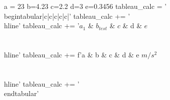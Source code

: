 \begin{pycode}
a = 23
b=4.23
c=2.2
d=3
e=0.3456
tableau_calc = '\\begin{tabular}{|c|c|c|c|c|}\n'
tableau_calc += '\\hline\n'
tableau_calc += '$a_1$ & $b_{test}$ & $c$ & d & $e$  \\\\ \\hline\n'
tableau_calc += f'{a} & {b} & {c} & {d} & {e} $m/s^2$\\\\ \\hline\n'
tableau_calc += '\\end{tabular}\n'
\end{pycode}